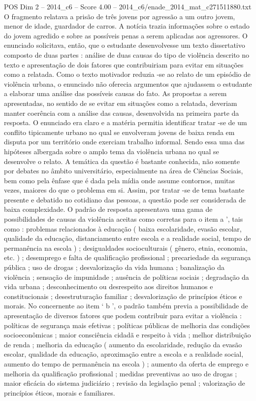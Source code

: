 \begin{textsample}{POS Dim 2 – 2014\_c6 – Score 4.00 – 2014\_c6/enade\_2014\_mat\_c271511880.txt}
O fragmento relatava a prisão de três jovens por agressão a um outro jovem, menor de idade, guardador de carros.
A notícia trazia informações sobre o estado do jovem agredido e sobre as possíveis penas a serem aplicadas aos agressores.
O enunciado solicitava, então, que o estudante desenvolvesse um texto dissertativo composto de duas partes : análise de duas causas do tipo de violência descrito no texto e apresentação de dois fatores que contribuiriam para evitar em situações como a relatada.
Como o texto motivador reduzia -se ao relato de um episódio de violência urbana, o enunciado não oferecia argumentos que ajudassem o estudante a elaborar uma análise das possíveis causas do fato.
As propostas a serem apresentadas, no sentido de se evitar em situações como a relatada, deveriam manter coerência com a análise das causas, desenvolvida na primeira parte da resposta.
O enunciado era claro e a matéria permitia identificar tratar -se de um conflito tipicamente urbano no qual se envolveram jovens de baixa renda em disputa por um território onde exerciam trabalho informal.
Sendo essa uma das hipóteses albergada sobre o amplo tema da violência urbana no qual se desenvolve o relato.
A temática da questão é bastante conhecida, não somente por debates no âmbito universitário, especialmente na área de Ciências Sociais, bem como pela ênfase que é dada pela mídia onde assume contornos, muitas vezes, maiores do que o problema em si.
Assim, por tratar -se de tema bastante presente e debatido no cotidiano das pessoas, a questão pode ser considerada de baixa complexidade.
O padrão de resposta apresentava uma gama de possibilidades de causas da violência aceitas como corretas para o item a ’, tais como : problemas relacionados à educação ( baixa escolaridade, evasão escolar, qualidade da educação, distanciamento entre escola e a realidade social, tempo de permanência na escola ) ; desigualdades socioculturais ( gênero, etnia, economia, etc. ) ; desemprego e falta de qualificação profissional ; precariedade da segurança pública ; uso de drogas ; desvalorização da vida humana ; banalização da violência ; sensação de impunidade ; ausência de políticas sociais ; degradação da vida urbana ; desconhecimento ou desrespeito aos direitos humanos e constitucionais ; desestruturação familiar ; desvalorização de princípios éticos e morais.
No concernente ao item ‘ b ’, o padrão também previa a possibilidade de apresentação de diversos fatores que podem contribuir para evitar a violência : políticas de segurança mais efetivas ; políticas públicas de melhoria das condições socioeconômicas ; maior consciência cidadã e respeito à vida ; melhor distribuição de renda ; melhoria da educação ( aumento da escolaridade, redução da evasão escolar, qualidade da educação, aproximação entre a escola e a realidade social, aumento do tempo de permanência na escola ) ; aumento da oferta de emprego e melhoria da qualificação profissional ; medidas preventivas ao uso de drogas ; maior eficácia do sistema judiciário ; revisão da legislação penal ; valorização de princípios éticos, morais e familiares.

\end{textsample}
